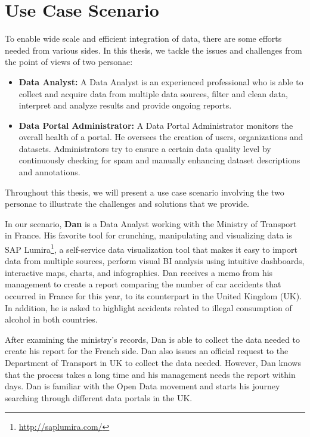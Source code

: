 \documentclass[a4paper,11pt,twoside]{ThesisStyle}
\begin{document}
\section{Use Case Scenario}\label{section:scenario}

To enable wide scale and efficient integration of data, there are some efforts needed from various sides. In this thesis, we tackle the issues and challenges from the point of views of two personae:

\begin{itemize}
	\item \textbf{Data Analyst:} A Data Analyst is an experienced professional who is able to collect and acquire data from multiple data sources, filter and clean data, interpret and analyze results and provide ongoing reports.
	\item \textbf{Data Portal Administrator:} A Data Portal Administrator monitors the overall health of a portal. He oversees the creation of users, organizations and datasets. Administrators try to ensure a certain data quality level by continuously checking for spam and manually enhancing dataset descriptions and annotations.
\end{itemize}

Throughout this thesis, we will present a use case scenario involving the two personae to illustrate the challenges and solutions that we provide.

In our scenario, \textbf{Dan} is a Data Analyst working with the Ministry of Transport in France. His favorite tool for crunching, manipulating and visualizing data is SAP Lumira\footnote{\url{http://saplumira.com/}}, a self-service data visualization tool that makes it easy to import data from multiple sources, perform visual BI analysis using intuitive dashboards, interactive maps, charts, and infographics. Dan receives a memo from his management to create a report comparing the number of car accidents that occurred in France for this year, to its counterpart in the United Kingdom (UK). In addition, he is asked to highlight accidents related to illegal consumption of alcohol in both countries.

After examining the ministry's records, Dan is able to collect the data needed to create his report for the French side. Dan also issues an official request to the Department of Transport in UK to collect the data needed. However, Dan knows that the process takes a long time and his management needs the report within days. Dan is familiar with the Open Data movement and starts his journey searching through different data portals in the UK.
\end{document}
